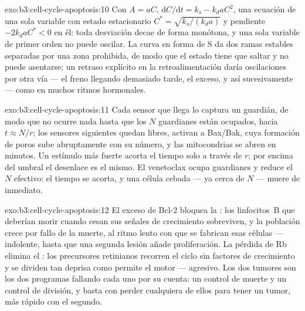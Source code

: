 \begin{solution}{exo:b3:cell-cycle-apoptosis:10}
Con $A = aC$, $\mathrm{d}C/\mathrm{d}t = k_{s} - k_{d}aC^{2}$, una
ecuación de una sola variable con estado estacionario
$C^{*} = \sqrt{k_{s}/(k_{d}a)}$ y pendiente $-2k_{d}aC^{*} < 0$ en él:
toda desviación decae de forma monótona, y una sola variable de primer
orden no puede oscilar. La curva en forma de S da dos ramas estables
separadas por una zona prohibida, de modo que el estado tiene que saltar
y no puede asentarse; un retraso explícito en la retroalimentación daría
oscilaciones por otra vía --- el freno llegando demasiado tarde, el
exceso, y así sucesivamente --- como en muchos ritmos hormonales.
\end{solution}

\begin{solution}{exo:b3:cell-cycle-apoptosis:11}
Cada sensor que llega lo captura un guardián, de modo que no ocurre nada
hasta que los $N$ guardianes están ocupados, hacia $t \approx N/r$; los
sensores siguientes quedan libres, activan a Bax/Bak, cuya formación de
poros sube abruptamente con su número, y las mitocondrias se abren en
minutos. Un estímulo más fuerte acorta el tiempo solo a través de $r$;
por encima del umbral el desenlace es el mismo. El venetoclax ocupa
guardianes y reduce el $N$ efectivo: el tiempo se acorta, y una célula
cebada --- ya cerca de $N$ --- muere de inmediato.
\end{solution}

\begin{solution}{exo:b3:cell-cycle-apoptosis:12}
El exceso de Bcl-2 bloquea la : los linfocitos~B que
deberían morir cuando cesan sus señales de crecimiento sobreviven, y la
población crece por fallo de la muerte, al ritmo lento con que se
fabrican esas células --- indolente, hasta que una segunda lesión añade
proliferación. La pérdida de Rb elimina el : los
precursores retinianos recorren el ciclo sin factores de crecimiento y se
dividen tan deprisa como permite el motor --- agresivo. Los dos tumores
son los dos programas fallando cada uno por su cuenta: un control de
muerte y un control de división, y basta con perder cualquiera de ellos
para tener un tumor, más rápido con el segundo.
\end{solution}

